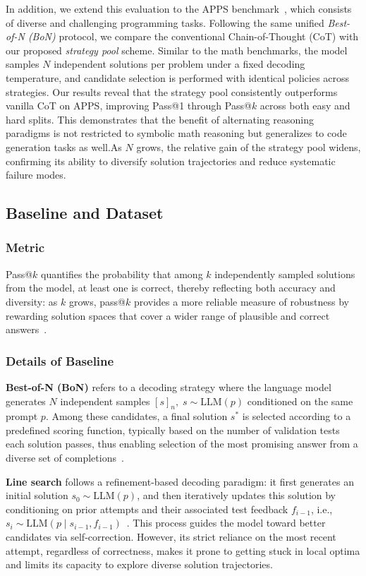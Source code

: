 \documentclass{article} %
\theoremstyle{definition}
\theoremstyle{remark}
\begin{document}
In addition, we extend this evaluation to the APPS benchmark~\citep{hendrycks2021measuring}, which consists of diverse and challenging programming tasks. Following the same unified \textit{Best-of-N (BoN)} protocol, we compare the conventional Chain-of-Thought (CoT) with our proposed \textit{strategy pool} scheme. Similar to the math benchmarks, the model samples $N$ independent solutions per problem under a fixed decoding temperature, and candidate selection is performed with identical policies across strategies. Our results reveal that the strategy pool consistently outperforms vanilla CoT on APPS, improving Pass@1 through Pass@$k$ across both easy and hard splits. This demonstrates that the benefit of alternating reasoning paradigms is not restricted to symbolic math reasoning but generalizes to code generation tasks as well.As $N$ grows, the relative gain of the strategy pool widens, confirming its ability to diversify solution trajectories and reduce systematic failure modes.


\subsection{Baseline and Dataset}
\subsubsection{Metric}
Pass@$k$ quantifies the probability that among $k$ independently sampled solutions from the model, at least one is correct, thereby reflecting both accuracy and diversity: as $k$ grows, pass@$k$ provides a more reliable measure of robustness by rewarding solution spaces that cover a wider range of plausible and correct answers~\citep{chen2021evaluating}.




\subsubsection{Details of Baseline}
\textbf{Best-of-N (BoN)} refers to a decoding strategy where the language model generates $N$ independent samples $[s]_n,\; s \sim \mathrm{LLM}(p)$ conditioned on the same prompt $p$. Among these candidates, a final solution $s^*$ is selected according to a predefined scoring function, typically based on the number of validation tests each solution passes, thus enabling selection of the most promising answer from a diverse set of completions~\citep{li2022competition, chen2024alphamath}. 

\textbf{Line search} follows a refinement-based decoding paradigm: it first generates an initial solution $s_0 \sim \mathrm{LLM}(p)$, and then iteratively updates this solution by conditioning on prior attempts and their associated test feedback $f_{i-1}$, i.e., $s_i \sim \mathrm{LLM}(p\mid s_{i-1}, f_{i-1})$~\citep{shinn2023reflexion, madaan2023selfrefine}. This process guides the model toward better candidates via self-correction. However, its strict reliance on the most recent attempt, regardless of correctness, makes it prone to getting stuck in local optima and limits its capacity to explore diverse solution trajectories.
\end{document}

